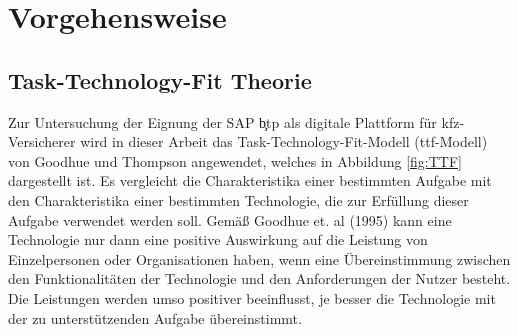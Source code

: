\clearpage
\chapter{Vorgehensweise}
\section{Task-Technology-Fit Theorie}






Zur Untersuchung der Eignung der SAP \c{btp} als digitale Plattform für \ac{kfz}-Versicherer wird in dieser Arbeit das Task-Technology-Fit-Modell (\acs{ttf}-Modell) von Goodhue und Thompson angewendet, welches in Abbildung \ref{fig:TTF} dargestellt ist. Es vergleicht die Charakteristika einer bestimmten Aufgabe mit den Charakteristika einer bestimmten Technologie, die zur Erfüllung dieser Aufgabe verwendet werden soll. Gemäß Goodhue et. al (1995) kann eine Technologie nur dann eine positive Auswirkung auf die Leistung von Einzelpersonen oder Organisationen haben, wenn eine Übereinstimmung zwischen den Funktionalitäten der Technologie und den Anforderungen der Nutzer besteht. Die Leistungen werden umso positiver beeinflusst, je besser die Technologie mit der zu unterstützenden Aufgabe übereinstimmt.\autocite[Vgl.][S. 214-216]{GOODHUE1995}



